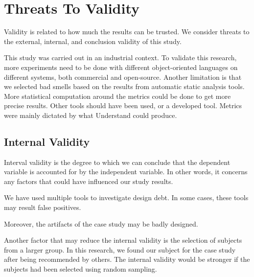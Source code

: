 







\section{Threats To Validity}
\label{sub:threats_to_validity}
Validity is related to how much the results can be trusted\cite{Wohlin:2000:ESE:330775}. We consider threats to the external, internal, and conclusion validity of this study.

This study was carried out in an industrial context. To validate this research, more experiments need to be done with different object-oriented languages on different systems, both commercial and open-source. Another limitation is that we selected bad smells based on the results from automatic static analysis tools. More statistical computation around the metrics could be done to get more precise results. Other tools should have been used, or a developed tool. Metrics were mainly dictated by what Understand could produce. 

\subsection{Internal Validity}
\label{sub:internal_validty}
Interval validity is the degree to which we can conclude that the dependent variable is accounted for by the independent variable\cite{Wohlin:2000:ESE:330775}. In other words, it concerns any factors that could have influenced our study results. 

We have used multiple tools to investigate design debt. In some cases, these tools may result false positives. 

Moreover, the artifacts of the case study may be badly designed. 

Another factor that may reduce the internal validity is the selection of subjects from a larger group\cite{Wohlin:2000:ESE:330775}. In this research, we found our subject for the case study after being recommended by others. The internal validity would be stronger if the subjects had been selected using random sampling.



